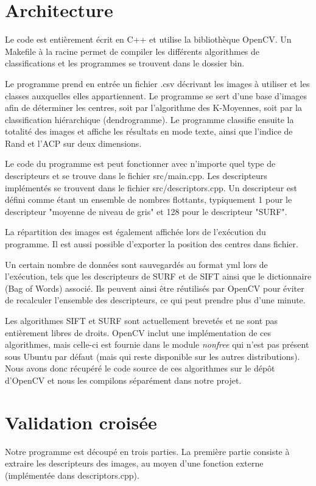 \documentclass[12pt,a4paper,utf8x]{report}
\begin{document}
\section{Architecture}
    Le code est entièrement écrit en C++ et utilise la bibliothèque OpenCV. Un Makefile à la racine permet de compiler les différents algorithmes de classifications et les programmes se trouvent dans le dossier bin.

    Le programme prend en entrée un fichier .csv décrivant les images à utiliser et les classes auxquelles elles appartiennent. Le programme se sert d'une base d'images afin de déterminer les centres, soit par l'algorithme des K-Moyennes, soit par la classification hiérarchique (dendrogramme). Le programme classifie ensuite la totalité des images et affiche les résultats en mode texte, ainsi que l'indice de Rand et l'ACP sur deux dimensions.

    Le code du programme est peut fonctionner avec n'importe quel type de descripteurs et se trouve dans le fichier src/main.cpp. Les descripteurs implémentés se trouvent dans le fichier src/descriptors.cpp. Un descripteur est défini comme étant un ensemble de nombres flottants, typiquement 1 pour le descripteur "moyenne de niveau de gris" et 128 pour le descripteur "SURF".

    La répartition des images est également affichée lors de l'exécution du programme. Il est aussi possible d'exporter la position des centres dans fichier.

    Un certain nombre de données sont sauvegardés au format yml lors de l'exécution, tels que les descripteurs de SURF et de SIFT ainsi que le dictionnaire (Bag of Words) associé. Ils peuvent ainsi être réutilisés par OpenCV pour éviter de recalculer l'ensemble des descripteurs, ce qui peut prendre plus d'une minute.

    Les algorithmes SIFT et SURF sont actuellement brevetés et ne sont pas entièrement libres de droits. OpenCV inclut une implémentation de ces algorithmes, mais celle-ci est fournie dans le module \textit{nonfree} qui n'est pas présent sous Ubuntu par défaut (mais qui reste disponible sur les autres distributions). Nous avons donc récupéré le code source de ces algorithmes sur le dépôt d'OpenCV et nous les compilons séparément dans notre projet.


\section{Validation croisée}
    Notre programme est découpé en trois parties. La première partie consiste à extraire les descripteurs des images, au moyen d'une fonction externe (implémentée dans descriptors.cpp).
\end{document}
